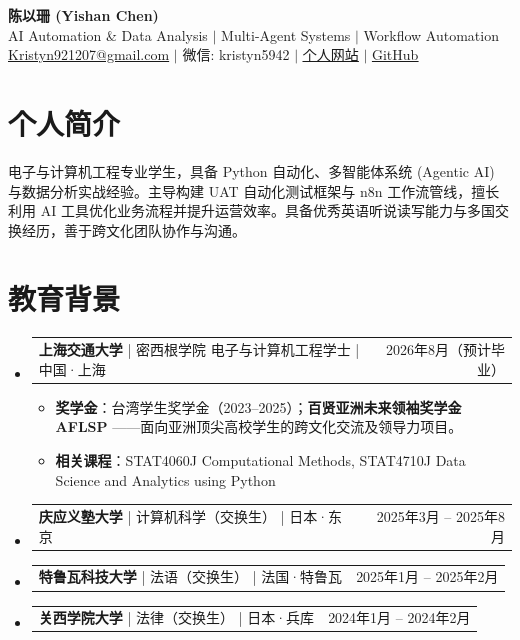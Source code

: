 \documentclass[UTF8,a4paper,10pt]{ctexart}
\makeatletter
\newcommand{\resumeItem}[1]{\item\small{\linespread{1.1}\selectfont #1\par}\vspace{-0.5pt}}
\newcommand{\resumeProjectHeading}[2]{%
  \item
  \begin{tabular*}{0.97\textwidth}{l@{\extracolsep{\fill}}r}
    \normalsize #1 & #2 \\
  \end{tabular*}\vspace{-4pt}
}
\newcommand{\resumeSubHeadingListStart}{\begin{itemize}[label={}, leftmargin=0.15in]}
\newcommand{\resumeSubHeadingListEnd}{\end{itemize}}
\newcommand{\resumeItemListStart}{\begin{itemize}[label=\tiny$\bullet$, itemsep=0pt, topsep=3pt, parsep=0pt]}
\newcommand{\resumeItemListEnd}{\end{itemize}\vspace{-6pt}}
\makeatother
\begin{document}
\begin{center}
  \textbf{\large \heiti 陈以珊 (Yishan Chen)} \\ \vspace{1pt}
  \small AI Automation \& Data Analysis $|$ Multi-Agent Systems $|$ Workflow Automation \\ \vspace{1pt}
  \small \href{mailto:Kristyn921207@gmail.com}{Kristyn921207@gmail.com} $|$ 微信: kristyn5942 $|$ \href{https://kristynchen.github.io/Personal-Website/}{\underline{个人网站}} $|$ \href{https://github.com/kristynchen}{\underline{GitHub}}
\end{center}
\vspace{-12pt}

\section{个人简介}
\small {电子与计算机工程专业学生，具备 Python 自动化、多智能体系统 (Agentic AI) 与数据分析实战经验。主导构建 UAT 自动化测试框架与 n8n 工作流管线，擅长利用 AI 工具优化业务流程并提升运营效率。具备优秀英语听说读写能力与多国交换经历，善于跨文化团队协作与沟通。}
\vspace{-4pt}

\section{教育背景}
\resumeSubHeadingListStart
  \resumeProjectHeading
    {\textbf{上海交通大学} \quad \quad | \quad 密西根学院 电子与计算机工程学士 \quad | \quad 中国·上海 }{2026年8月（预计毕业）}
    \resumeItemListStart
      \resumeItem{\textbf{奖学金}：台湾学生奖学金（2023--2025）；\textbf{百贤亚洲未来领袖奖学金 AFLSP }——面向亚洲顶尖高校学生的跨文化交流及领导力项目。}
      \resumeItem{\textbf{相关课程}：STAT4060J Computational Methods, STAT4710J Data Science and Analytics using Python}
    \resumeItemListEnd

  \resumeProjectHeading
    {\textbf{庆应义塾大学} \quad \quad | \quad 计算机科学（交换生） \quad | \quad 日本·东京}{2025年3月 -- 2025年8月}
  \resumeProjectHeading
    {\textbf{特鲁瓦科技大学} \quad | \quad 法语（交换生） \quad | \quad 法国·特鲁瓦}{2025年1月 -- 2025年2月}
  \resumeProjectHeading
    {\textbf{关西学院大学} \quad \quad | \quad 法律（交换生） \quad | \quad 日本·兵库}{2024年1月 -- 2024年2月}
\resumeSubHeadingListEnd

\end{document}
